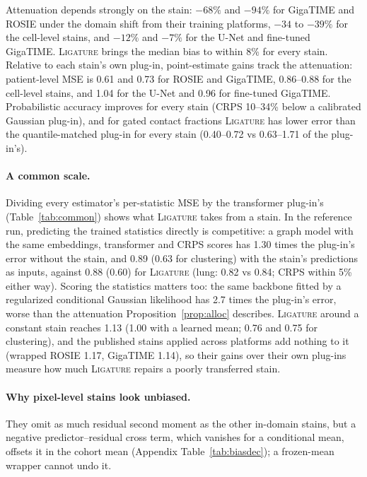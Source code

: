 \documentclass[10pt,letterpaper]{article}
\theoremstyle{definition}
\theoremstyle{remark}
\newcommand{\method}{\textnormal{\textsc{Ligature}}}
\begin{document}
Attenuation depends strongly on the stain: $-68\%$ and $-94\%$ for GigaTIME and ROSIE under the domain shift from their training platforms, $-34$ to $-39\%$ for the cell-level stains, and $-12\%$ and $-7\%$ for the U-Net and fine-tuned GigaTIME. \method{} brings the median bias to within 8\% for every stain. Relative to each stain's own plug-in, point-estimate gains track the attenuation: patient-level MSE is 0.61 and 0.73 for ROSIE and GigaTIME, 0.86--0.88 for the cell-level stains, and 1.04 for the U-Net and 0.96 for fine-tuned GigaTIME. Probabilistic accuracy improves for every stain (CRPS 10--34\% below a calibrated Gaussian plug-in), and for gated contact fractions \method{} has lower error than the quantile-matched plug-in for every stain (0.40--0.72 vs 0.63--1.71 of the plug-in's).

\paragraph{A common scale.} Dividing every estimator's per-statistic MSE by the transformer plug-in's (Table~\ref{tab:common}) shows what \method{} takes from a stain. In the reference run, predicting the trained statistics directly is competitive: a graph model with the same embeddings, transformer and CRPS scores has 1.30 times the plug-in's error without the stain, and 0.89 (0.63 for clustering) with the stain's predictions as inputs, against 0.88 (0.60) for \method{} (lung: 0.82 vs 0.84; CRPS within 5\% either way). Scoring the statistics matters too: the same backbone fitted by a regularized conditional Gaussian likelihood has 2.7 times the plug-in's error, worse than the attenuation Proposition~\ref{prop:alloc} describes. \method{} around a constant stain reaches 1.13 (1.00 with a learned mean; 0.76 and 0.75 for clustering), and the published stains applied across platforms add nothing to it (wrapped ROSIE 1.17, GigaTIME 1.14), so their gains over their own plug-ins measure how much \method{} repairs a poorly transferred stain.

\paragraph{Why pixel-level stains look unbiased.} They omit as much residual second moment as the other in-domain stains, but a negative predictor--residual cross term, which vanishes for a conditional mean, offsets it in the cohort mean (Appendix Table~\ref{tab:biasdec}); a frozen-mean wrapper cannot undo it.
\end{document}
